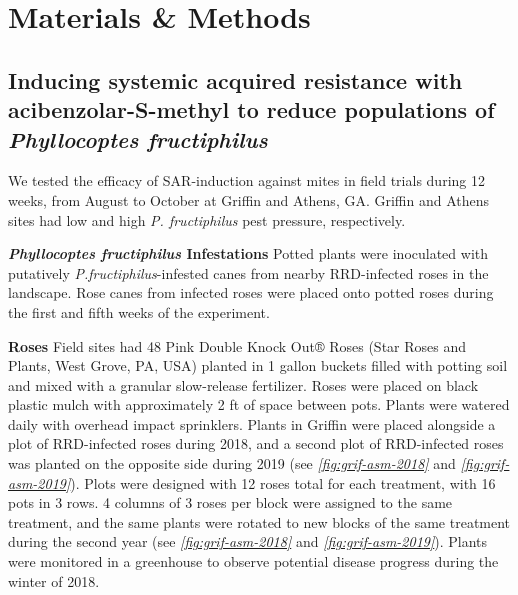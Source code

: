 \documentclass{ufdissertation}[overrideChapters] %
\begin{document}
{\hypertarget{materials-methods-2}{%
\section{Materials \& Methods}\label{materials-methods-2}}

\hypertarget{inducing-systemic-acquired-resistance-with-acibenzolar-s-methyl-to-reduce-populations-of-phyllocoptes-fructiphilus}{%
\subsection{\texorpdfstring{Inducing systemic acquired resistance with acibenzolar-S-methyl to reduce populations of \emph{Phyllocoptes fructiphilus}}{Inducing systemic acquired resistance with acibenzolar-S-methyl to reduce populations of Phyllocoptes fructiphilus}}\label{inducing-systemic-acquired-resistance-with-acibenzolar-s-methyl-to-reduce-populations-of-phyllocoptes-fructiphilus}}

We tested the efficacy of SAR-induction against mites in field trials during 12 weeks, from August to October at Griffin and Athens, GA. Griffin and Athens sites had low and high \emph{P. fructiphilus} pest pressure, respectively.

\textbf{\emph{Phyllocoptes fructiphilus} Infestations}
Potted plants were inoculated with putatively \emph{P.fructiphilus}-infested canes from nearby RRD-infected roses in the landscape. Rose canes from infected roses were placed onto potted roses during the first and fifth weeks of the experiment.

\textbf{Roses}
Field sites had 48 Pink Double Knock Out® Roses (Star Roses and Plants, West Grove, PA, USA) planted in 1 gallon buckets filled with potting soil and mixed with a granular slow-release fertilizer. Roses were placed on black plastic mulch with approximately 2 ft of space between pots. Plants were watered daily with overhead impact sprinklers. Plants in Griffin were placed alongside a plot of RRD-infected roses during 2018, and a second plot of RRD-infected roses was planted on the opposite side during 2019 (see \emph{\ref{fig:grif-asm-2018}} and \emph{\ref{fig:grif-asm-2019}}). Plots were designed with 12 roses total for each treatment, with 16 pots in 3 rows. 4 columns of 3 roses per block were assigned to the same treatment, and the same plants were rotated to new blocks of the same treatment during the second year (see \emph{\ref{fig:grif-asm-2018}} and \emph{\ref{fig:grif-asm-2019}}). Plants were monitored in a greenhouse to observe potential disease progress during the winter of 2018.

}
\end{document}
